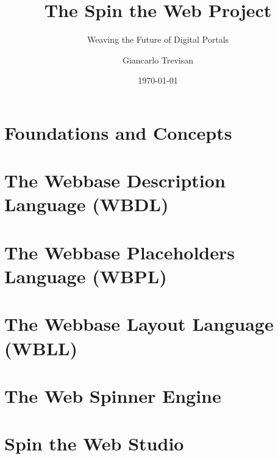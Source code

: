 \documentclass[11pt,openright,twoside,a4paper]{book}
\title{The Spin the Web Project}
\subtitle{Weaving the Future of Digital Portals}
\author{Giancarlo Trevisan}
\date{\today}
\begin{document}
\frontmatter




\tableofcontents

\mainmatter

\part{Foundations and Concepts}







\part{The Webbase Description Language (WBDL)}





\part{The Webbase Placeholders Language (WBPL)}


\part{The Webbase Layout Language (WBLL)}


\part{The Web Spinner Engine}



\part{Spin the Web Studio}


\end{document}
